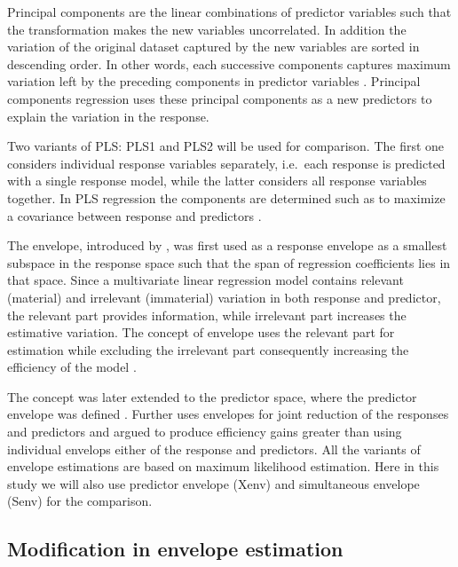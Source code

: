 \documentclass[12pt,3p,authoryear]{elsarticle}
\providecommand{\tightlist}{%
  \setlength{\itemsep}{0pt}\setlength{\parskip}{0pt}}
\begin{document}
\begin{description}
\tightlist
\item[\emph{Principal Components Regression (PCR):}]
Principal components are the linear combinations of predictor variables
such that the transformation makes the new variables uncorrelated. In
addition the variation of the original dataset captured by the new
variables are sorted in descending order. In other words, each
successive components captures maximum variation left by the preceding
components in predictor variables \citep{Jolliffe2002}. Principal
components regression uses these principal components as a new
predictors to explain the variation in the response.
\item[\emph{Partial Least Squares (PLS):}]
Two variants of PLS: PLS1 and PLS2 will be used for comparison. The
first one considers individual response variables separately, i.e.~each
response is predicted with a single response model, while the latter
considers all response variables together. In PLS regression the
components are determined such as to maximize a covariance between
response and predictors \citep{DeJong1993}.
\item[\emph{Envelopes:}]
The envelope, introduced by \citet{Cook2007a}, was first used as a
response envelope \citep{cook2010envelope} as a smallest subspace in the
response space such that the span of regression coefficients lies in
that space. Since a multivariate linear regression model contains
relevant (material) and irrelevant (immaterial) variation in both
response and predictor, the relevant part provides information, while
irrelevant part increases the estimative variation. The concept of
envelope uses the relevant part for estimation while excluding the
irrelevant part consequently increasing the efficiency of the model
\citep{cook2016algorithms}.

The concept was later extended to the predictor space, where the
predictor envelope was defined \citep{cook2013envelopes}. Further
\citet{cook2015simultaneous} uses envelopes for joint reduction of the
responses and predictors and argued to produce efficiency gains greater
than using individual envelops either of the response and predictors.
All the variants of envelope estimations are based on maximum likelihood
estimation. Here in this study we will also use predictor envelope
(Xenv) and simultaneous envelope (Senv) for the comparison.
\end{description}

\subsection{Modification in envelope
estimation}\label{modification-in-envelope-estimation}
\end{document}
